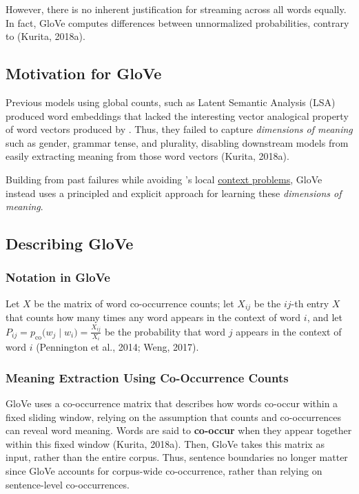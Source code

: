 However, there is no inherent justification for streaming across all words equally. In fact, GloVe computes differences between unnormalized probabilities, contrary to  (Kurita, 2018a). 


\subsection{Motivation for GloVe} \label{sec:MotivationGlove}

Previous models using global counts, such as Latent Semantic Analysis (LSA) produced word embeddings that lacked the interesting vector analogical property of word vectors produced by . Thus, they failed to capture \emph{dimensions of meaning} such as gender, grammar tense, and plurality, disabling downstream models from easily extracting meaning from those word vectors (Kurita, 2018a).  

Building from past failures while avoiding 's local \hyperref[sec:ProblemWord2VecFromGloveStandpoint]{context problems}, GloVe instead uses a principled and explicit approach for learning these \emph{dimensions of meaning}.


\subsection{Describing GloVe} \label{sec:DefGlove}

\subsubsection{Notation in GloVe}

Let $X$ be the matrix of word co-occurrence counts; let $X_{ij}$ be the $ij$-th entry $X$ that counts how many times any word appears in the context of word $i$, and let $P_{ij} = p_{\text{co}} \Big(w_j \; | \; w_i \Big) = \frac {X_{ij}} {X_i}$ be the probability that word $j$ appears in the context of word $i$ (Pennington et al., 2014; Weng, 2017).

\subsubsection{Meaning Extraction Using Co-Occurrence Counts}

GloVe uses a co-occurrence matrix that describes how words co-occur within a fixed sliding window, relying on the assumption that counts and co-occurrences can reveal word meaning. Words are said to \textbf{co-occur} when they appear together within this fixed window (Kurita, 2018a). Then, GloVe takes this matrix as input, rather than the entire corpus. Thus, sentence boundaries no longer matter since GloVe accounts for corpus-wide co-occurrence, rather than relying on sentence-level co-occurrences.  

